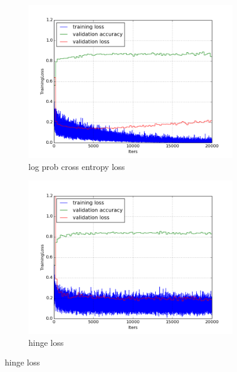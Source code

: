 \documentclass[a4paper,11pt]{article}
\begin{document}
\begin{figure}
    \centering
    \begin{minipage}[b]{\textwidth}
      \begin{subfigure}{.5\textwidth} 
        \centering
        \includegraphics[scale=0.4]{images/plot_clampdet_none.png}
        \caption{log prob cross entropy loss}\label{fig:2a}
      \end{subfigure}%
      \begin{subfigure}{.5\textwidth} 
        \centering
        \includegraphics[scale=0.4]{images/plot_clampdet_linSVM.png}
        \caption{hinge loss}\label{fig:2b}
      \end{subfigure} \par \vspace*{20pt} %
      \caption{hinge loss}\label{fig:2}
    \end{minipage}%
\end{figure}
\end{document}
